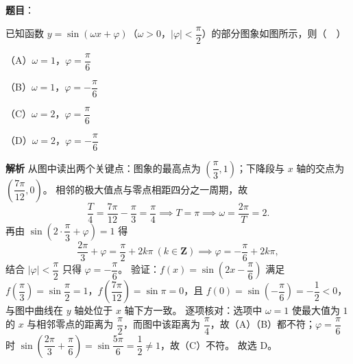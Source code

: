 \begin{answer}

\textbf{题目}：

已知函数 $y=\sin(\omega x+\varphi)$（$\omega>0$，$|\varphi|<\dfrac{\pi}{2}$）的部分图象如图所示，则（　）

（A）$\omega=1$，$\varphi=\dfrac{\pi}{6}$

（B）$\omega=1$，$\varphi=-\dfrac{\pi}{6}$

（C）$\omega=2$，$\varphi=\dfrac{\pi}{6}$

（D）$\omega=2$，$\varphi=-\dfrac{\pi}{6}$
\nopagebreak[4]
\begin{center}\end{center}
\nopagebreak[4]
\textbf{解析}
从图中读出两个关键点：图象的最高点为 $\left(\dfrac{\pi}{3},1\right)$；下降段与 $x$ 轴的交点为 $\left(\dfrac{7\pi}{12},0\right)$。
相邻的极大值点与零点相距四分之一周期，故
\nopagebreak[4]
\[\frac{T}{4}=\frac{7\pi}{12}-\frac{\pi}{3}=\frac{\pi}{4}\implies T=\pi\implies\omega=\frac{2\pi}{T}=2.\]
再由 $\sin\left(2\cdot\dfrac{\pi}{3}+\varphi\right)=1$ 得
\nopagebreak[4]
\[\frac{2\pi}{3}+\varphi=\frac{\pi}{2}+2k\pi\ (k\in\mathbf Z)\implies\varphi=-\frac{\pi}{6}+2k\pi,\]
结合 $\left|\varphi\right|<\dfrac{\pi}{2}$ 只得 $\varphi=-\dfrac{\pi}{6}$。
验证：$f(x)=\sin\left(2x-\dfrac{\pi}{6}\right)$ 满足 $f\left(\dfrac{\pi}{3}\right)=\sin\dfrac{\pi}{2}=1$，$f\left(\dfrac{7\pi}{12}\right)=\sin\pi=0$，且 $f(0)=\sin\left(-\dfrac{\pi}{6}\right)=-\dfrac12<0$，与图中曲线在 $y$ 轴处位于 $x$ 轴下方一致。
逐项核对：选项中 $\omega=1$ 使最大值为 $1$ 的 $x$ 与相邻零点的距离为 $\dfrac{\pi}{2}$，而图中该距离为 $\dfrac{\pi}{4}$，故（A）（B）都不符；$\varphi=\dfrac{\pi}{6}$ 时 $\sin\left(\dfrac{2\pi}{3}+\dfrac{\pi}{6}\right)=\sin\dfrac{5\pi}{6}=\dfrac12\neq1$，故（C）不符。
故选 D。


\end{answer}
